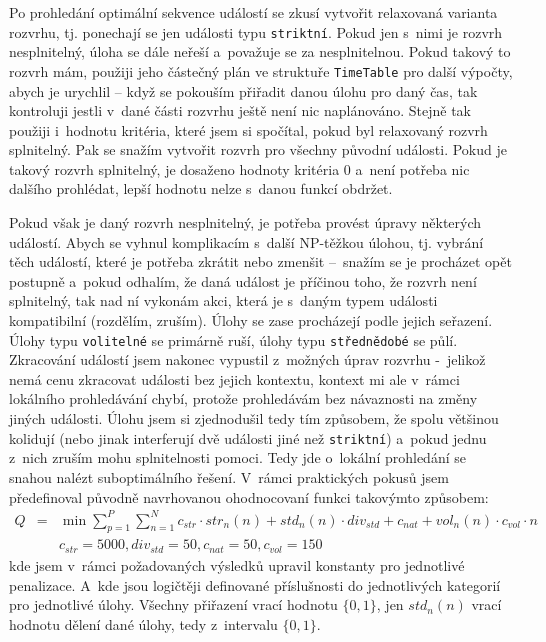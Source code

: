 \documentclass[a4paper,11pt]{article}
\begin{document}
Po prohledání optimální sekvence událostí se zkusí vytvořit relaxovaná varianta rozvrhu, tj. ponechají se jen události typu \texttt{striktní}. Pokud jen s~nimi je rozvrh nesplnitelný, úloha se dále neřeší a~považuje se za nesplnitelnou. Pokud takový to rozvrh mám, použiji jeho částečný plán ve struktuře \texttt{TimeTable} pro další výpočty, abych je urychlil -- když se pokouším přiřadit danou úlohu pro daný čas, tak kontroluji jestli v~dané části rozvrhu ještě není nic naplánováno. Stejně tak použiji i~hodnotu kritéria, které jsem si spočítal, pokud byl relaxovaný rozvrh splnitelný. Pak se snažím vytvořit rozvrh pro všechny původní události. Pokud je takový rozvrh splnitelný, je dosaženo hodnoty kritéria 0 a~není potřeba nic dalšího prohlédat, lepší hodnotu nelze s~danou funkcí obdržet.

Pokud však je daný rozvrh nesplnitelný, je potřeba provést úpravy některých událostí. Abych se vyhnul komplikacím s~další NP-těžkou úlohou, tj. vybrání těch událostí, které je potřeba zkrátit nebo zmenšit --~snažím se je procházet opět postupně a~pokud odhalím, že daná událost je příčinou toho, že rozvrh není splnitelný, tak nad ní vykonám akci, která je s~daným typem události kompatibilní (rozdělím, zruším). Úlohy se zase procházejí podle jejich seřazení. Úlohy typu \texttt{volitelné} se primárně ruší, úlohy typu \texttt{střednědobé} se půlí. Zkracování událostí jsem nakonec vypustil z~možných úprav rozvrhu -~jelikož nemá cenu zkracovat události bez jejich kontextu, kontext mi ale v~rámci lokálního prohledávání chybí, protože prohledávám bez návaznosti na změny jiných události. Úlohu jsem si zjednodušil tedy tím způsobem, že spolu většinou kolidují (nebo jinak interferují dvě události jiné než \texttt{striktní}) a~pokud jednu z~nich zruším mohu splnitelnosti pomoci. Tedy jde o~lokální prohledání se snahou nalézt suboptimálního řešení. V~rámci praktických pokusů jsem předefinoval původně navrhovanou ohodnocovaní funkci takovýmto způsobem:
\begin{eqnarray*}
Q &=& \min \sum_{p=1}^P \sum_{n=1}^N c_{str} \cdot str_n(n) + std_n(n) \cdot div_{std} +  c_{nat} + vol_n(n) \cdot c_{vol} \cdot n\\
&&c_{str} = 5000, div_{std} = 50, c_{nat} = 50, c_{vol} = 150
\end{eqnarray*}
kde jsem v~rámci požadovaných výsledků upravil konstanty pro jednotlivé penalizace. A~kde jsou logičtěji definované příslušnosti do jednotlivých kategorií pro jednotlivé úlohy. Všechny přiřazení vrací hodnotu $\lbrace0,1\rbrace$, jen $std_n(n)$ vrací hodnotu dělení dané úlohy, tedy z~intervalu  $\lbrace0,1\rbrace$.
\end{document}
